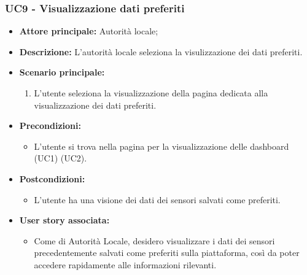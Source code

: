 \subsubsection{UC9 - Visualizzazione dati preferiti}
\begin{itemize}
    \item \textbf{Attore principale:} Autorità locale;
    \item \textbf{Descrizione:} L’autorità locale seleziona la visulizzazione dei dati preferiti.
    \item \textbf{Scenario principale:}
          \begin{enumerate}
              \item L'utente seleziona la visualizzazione della pagina dedicata alla visualizzazione dei dati preferiti.
          \end{enumerate}
    \item \textbf{Precondizioni:}
          \begin{itemize}
              \item  L'utente si trova nella pagina per la visualizzazione delle dashboard (UC1) (UC2).
          \end{itemize}
    \item \textbf{Postcondizioni:}
          \begin{itemize}
              \item  L'utente ha una visione dei dati dei sensori salvati come preferiti.
          \end{itemize}
    \item \textbf{User story associata:}
          \begin{itemize}
              \item Come di Autorità Locale, desidero visualizzare i dati dei sensori precedentemente salvati come preferiti sulla piattaforma, così da poter accedere rapidamente alle informazioni rilevanti.
          \end{itemize}
\end{itemize}